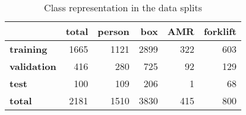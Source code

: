 \begin{table}[htbp]
\centering
\caption{Class representation in the data splits}
\label{tab:class_representation}
\begin{tabular}{lrrrrr}
\toprule
 & \bfseries total & \bfseries person & \bfseries box & \bfseries AMR & \bfseries forklift \\
\midrule
\bfseries training & 1665 & 1121 & 2899 & 322 & 603 \\
\bfseries validation & 416 & 280 & 725 & 92 & 129 \\
\bfseries test & 100 & 109 & 206 & 1 & 68 \\
\bfseries total & 2181 & 1510 & 3830 & 415 & 800 \\
\bottomrule
\end{tabular}
\end{table}
